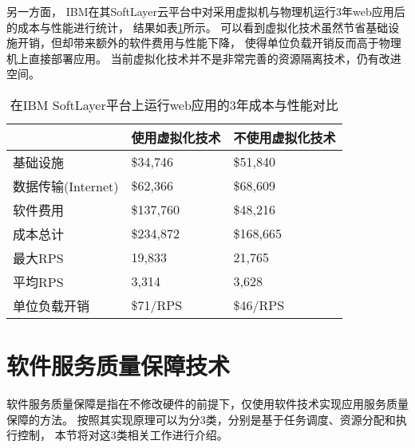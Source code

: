 另一方面，
IBM在其SoftLayer云平台中对采用虚拟机与物理机运行3年web应用后的成本与性能进行统计\cite{Stadtmueller:2015}，
结果如表\ref{tab:ibm:vmm-eval}所示。
可以看到虚拟化技术虽然节省基础设施开销，但却带来额外的软件费用与性能下降，
使得单位负载开销反而高于物理机上直接部署应用。
当前虚拟化技术并不是非常完善的资源隔离技术，仍有改进空间。

\begin{table}[t]
  \centering
  \begin{minipage}[t]{0.8\linewidth}
  \caption{在IBM SoftLayer平台上运行web应用的3年成本与性能对比\cite{Stadtmueller:2015}}
  \label{tab:ibm:vmm-eval}
  \begin{tabular*}{\linewidth}{p{}<{\centering}p{}<{\raggedleft}p{}<{\raggedleft}}
    \toprule[1.5pt]
                       & \textbf{使用虚拟化技术} & \textbf{不使用虚拟化技术} \\
    \midrule[1pt]
    基础设施	       &                \$34,746 &                  \$51,840 \\
    数据传输(Internet) &                \$62,366 &                  \$68,609 \\
    软件费用	       &               \$137,760 &                  \$48,216 \\
    成本总计	       &               \$234,872 &                 \$168,665 \\
    最大RPS	       &                  19,833 &                    21,765 \\
    平均RPS	       &                   3,314 &                     3,628 \\
    单位负载开销       &                \$71/RPS &                  \$46/RPS \\
    \bottomrule[1.5pt]
  \end{tabular*}
  \end{minipage}
\end{table}

%
%
%

\section{软件服务质量保障技术}

软件服务质量保障是指在不修改硬件的前提下，仅使用软件技术实现应用服务质量保障的方法。
按照其实现原理可以为分3类，分别是基于任务调度、资源分配和执行控制，
本节将对这3类相关工作进行介绍。

